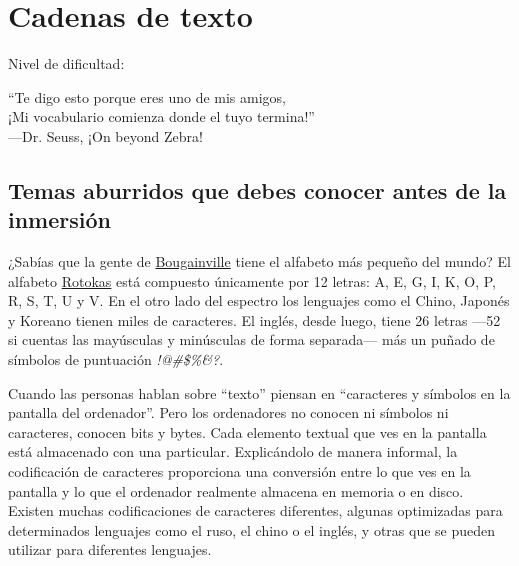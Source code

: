 
\chapter{Cadenas de texto}\label{ch:cadenas}

\noindent
Nivel de dificultad:\diflll

\begin{citaCap}
``Te digo esto porque eres uno de mis amigos, \\
¡Mi vocabulario comienza donde el tuyo termina!'' \\
---Dr. Seuss, ¡On beyond Zebra!
\end{citaCap}

\section{Temas aburridos que debes conocer antes de la inmersión}

¿Sabías que la gente de \href{http://en.wikipedia.org/wiki/Bougainville\_Province}{Bougainville} tiene el alfabeto más pequeño del mundo? El alfabeto \href{http://en.wikipedia.org/wiki/Rotokas\_alphabet}{Rotokas} está compuesto únicamente por 12 letras: A, E, G, I, K, O, P, R, S, T, U y V. En el otro lado del espectro los lenguajes como el Chino, Japonés y Koreano tienen miles de caracteres. El inglés, desde luego, tiene 26 letras ---52 si cuentas las mayúsculas y minúsculas de forma separada--- más un puñado de símbolos de puntuación \emph{!@\#\$\%\&?}.

Cuando las personas hablan sobre ``texto'' piensan en ``caracteres y símbolos en la pantalla del ordenador''. Pero los ordenadores no conocen ni símbolos ni caracteres, conocen bits y bytes. Cada elemento textual que ves en la pantalla está almacenado con una  particular. Explicándolo de manera informal, la codificación de caracteres proporciona una conversión entre lo que ves en la pantalla y lo que el ordenador realmente almacena en memoria o en disco. Existen muchas codificaciones de caracteres diferentes, algunas optimizadas para determinados lenguajes como el ruso, el chino o el inglés, y otras que se pueden utilizar para diferentes lenguajes.

